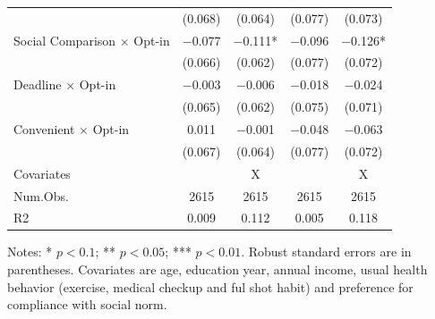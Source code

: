 \documentclass[
]{article}
\begin{document}
\begin{table}
\begin{threeparttable}
\begin{tabular}[t]{lcccc}
 & (\num{0.068}) & (\num{0.064}) & (\num{0.077}) & (\num{0.073})\\
Social Comparison $\times$ Opt-in & \num{-0.077} & \num{-0.111}* & \num{-0.096} & \num{-0.126}*\\
 & (\num{0.066}) & (\num{0.062}) & (\num{0.077}) & (\num{0.072})\\
Deadline $\times$ Opt-in & \num{-0.003} & \num{-0.006} & \num{-0.018} & \num{-0.024}\\
 & (\num{0.065}) & (\num{0.062}) & (\num{0.075}) & (\num{0.071})\\
Convenient $\times$ Opt-in & \num{0.011} & \num{-0.001} & \num{-0.048} & \num{-0.063}\\
 & (\num{0.067}) & (\num{0.064}) & (\num{0.077}) & (\num{0.072})\\
\midrule
Covariates &  & X &  & X\\
Num.Obs. & \num{2615} & \num{2615} & \num{2615} & \num{2615}\\
R2 & \num{0.009} & \num{0.112} & \num{0.005} & \num{0.118}\\
\bottomrule
\end{tabular}
\begin{tablenotes}
\item Notes: * $p < 0.1$; ** $p < 0.05$; *** $p < 0.01$. Robust standard errors are in parentheses. Covariates are age, education year, annual income, usual health behavior (exercise, medical checkup and ful shot habit) and preference for compliance with social norm.
\end{tablenotes}
\end{threeparttable}
\end{table}
\end{document}
